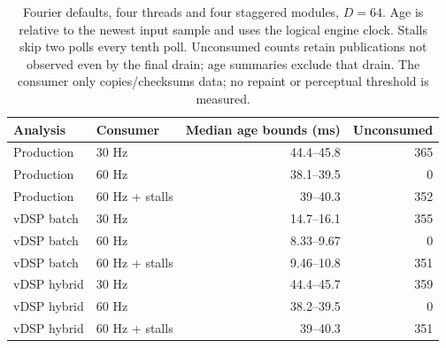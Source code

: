 \begin{table}[htbp]
\centering\small
\begin{tabular}{@{}llrr@{}}
\toprule
Analysis & Consumer & Median age bounds (ms) & Unconsumed \\
\midrule
Production & 30 Hz & 44.4--45.8 & 365 \\
Production & 60 Hz & 38.1--39.5 & 0 \\
Production & 60 Hz + stalls & 39--40.3 & 352 \\
vDSP batch & 30 Hz & 14.7--16.1 & 355 \\
vDSP batch & 60 Hz & 8.33--9.67 & 0 \\
vDSP batch & 60 Hz + stalls & 9.46--10.8 & 351 \\
vDSP hybrid & 30 Hz & 44.4--45.7 & 359 \\
vDSP hybrid & 60 Hz & 38.2--39.5 & 0 \\
vDSP hybrid & 60 Hz + stalls & 39--40.3 & 351 \\
\bottomrule
\end{tabular}
\caption{Fourier defaults, four threads and four staggered modules, $D=64$. Age is relative to the newest input sample and uses the logical engine clock. Stalls skip two polls every tenth poll. Unconsumed counts retain publications not observed even by the final drain; age summaries exclude that drain. The consumer only copies/checksums data; no repaint or perceptual threshold is measured.}
\label{tab:study-consumer}
\end{table}
